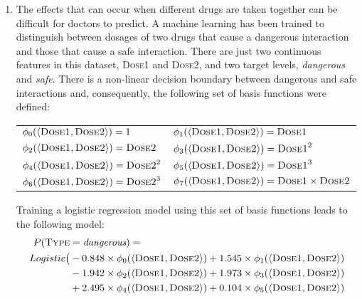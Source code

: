 \documentclass[--SOLUTION-OPTION--]{ditpaper}
\begin{document}
\begin{enumerate}
		\item The effects that can occur when different drugs are taken together can be difficult for doctors to predict. A machine learning has been trained to distinguish between dosages of two drugs that cause a dangerous interaction and those that cause a safe interaction. There are just two continuous features in this dataset, \textsc{Dose1} and \textsc{Dose2}, and two target levels, \textit{dangerous} and \textit{safe}. There is a non-linear decision boundary between dangerous and safe interactions and, consequently, the following set of basis functions were defined:
	\begin{center}
\begin{tabular}[ht]{ l l }
$\phi_0(\mathbf{\left<\textsc{Dose1}, \textsc{Dose2}\right>}) =  1$ &
$\phi_1(\left<\textsc{Dose1}, \textsc{Dose2}\right>) = \textsc{Dose1}$  \\
$\phi_2(\left<\textsc{Dose1}, \textsc{Dose2}\right>) = \textsc{Dose2}$  &
$\phi_3(\left<\textsc{Dose1}, \textsc{Dose2}\right>) = \textsc{Dose1}^2$ \\
$\phi_4(\left<\textsc{Dose1}, \textsc{Dose2}\right>) = \textsc{Dose2}^2$ &
$\phi_5(\left<\textsc{Dose1}, \textsc{Dose2}\right>) = \textsc{Dose1}^3$ \\
$\phi_6(\left<\textsc{Dose1}, \textsc{Dose2}\right>) = \textsc{Dose2}^3$ &
 $\phi_7(\left<\textsc{Dose1}, \textsc{Dose2}\right>) = \textsc{Dose1} \times \textsc{Dose2}$ \\
\end{tabular}
\end{center}
Training a logistic regression model using this set of basis functions leads to the following model:
			\begin{alignat*}{2}				
P(\textsc{Type}&=\textit{dangerous}) = \\
 Logistic\big(&-0.848\times \phi_0(\mathbf{\left<\textsc{Dose1}, \textsc{Dose2}\right>}) 
  + 1.545 \times\phi_1(\mathbf{\left<\textsc{Dose1}, \textsc{Dose2}\right>})   \\
 & -1.942 \times\phi_2(\mathbf{\left<\textsc{Dose1}, \textsc{Dose2}\right>})
  + 1.973 \times\phi_3(\mathbf{\left<\textsc{Dose1}, \textsc{Dose2}\right>}) \\
 & +  2.495   \times  \phi_4(\mathbf{\left<\textsc{Dose1}, \textsc{Dose2}\right>})
   + 0.104 \times\phi_5(\mathbf{\left<\textsc{Dose1}, \textsc{Dose2}\right>})   \\

\end{alignat*}
\end{enumerate}
\end{document}
